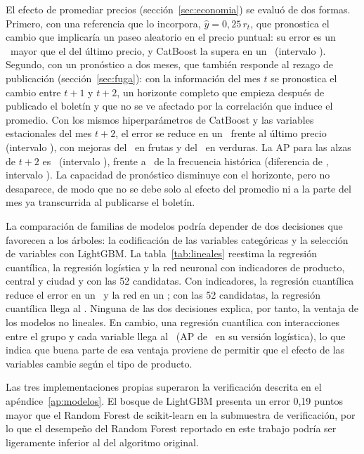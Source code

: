 El efecto de promediar precios (sección~\ref{sec:economia}) se evaluó de dos formas. Primero, con una referencia que lo incorpora, $\hat y=0{,}25\,r_t$, que pronostica el cambio que implicaría un paseo aleatorio en el precio puntual: su error es un \rvwkarabs\pct\ mayor que el del último precio, y CatBoost la supera en un \rvwkcat\pct\ (intervalo \rvwkcatic). Segundo, con un pronóstico a dos meses, que también responde al rezago de publicación (sección~\ref{sec:fuga}): con la información del mes $t$ se pronostica el cambio entre $t+1$ y $t+2$, un horizonte completo que empieza después de publicado el boletín y que no se ve afectado por la correlación que induce el promedio. Con los mismos hiperparámetros de CatBoost y las variables estacionales del mes $t+2$, el error se reduce en un \rvhdosred\pct\ frente al último precio (intervalo \rvhdosredic), con mejoras del \rvhdosfru\pct\ en frutas y del \rvhdosver\pct\ en verduras. La AP para las alzas de $t+2$ es \rvhdosap\ (intervalo \rvhdosapic), frente a \rvhdosfrec\ de la frecuencia histórica (diferencia de \rvhdosdif, intervalo \rvhdosdific). La capacidad de pronóstico disminuye con el horizonte, pero no desaparece, de modo que no se debe solo al efecto del promedio ni a la parte del mes ya transcurrida al publicarse el boletín.

La comparación de familias de modelos podría depender de dos decisiones que favorecen a los árboles: la codificación de las variables categóricas y la selección de variables con LightGBM. La tabla~\ref{tab:lineales} reestima la regresión cuantílica, la regresión logística y la red neuronal con indicadores de producto, central y ciudad y con las 52 candidatas. Con indicadores, la regresión cuantílica reduce el error en un \rvlinoh\pct\ y la red en un \rvmlpoh\pct; con las 52 candidatas, la regresión cuantílica llega al \rvlincand\pct. Ninguna de las dos decisiones explica, por tanto, la ventaja de los modelos no lineales. En cambio, una regresión cuantílica con interacciones entre el grupo y cada variable llega al \rvlininter\pct\ (AP de \rvlininterap\ en su versión logística), lo que indica que buena parte de esa ventaja proviene de permitir que el efecto de las variables cambie según el tipo de producto.





Las tres implementaciones propias superaron la verificación descrita en el apéndice~\ref{ap:modelos}. El bosque de LightGBM presenta un error 0,19 puntos mayor que el Random Forest de scikit-learn en la submuestra de verificación, por lo que el desempeño del Random Forest reportado en este trabajo podría ser ligeramente inferior al del algoritmo original.

